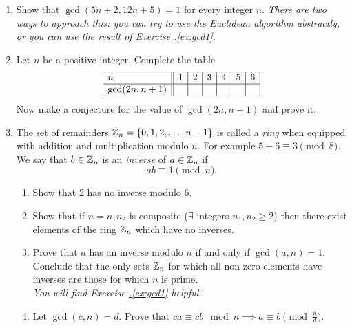 \begin{exercises}{}{}
\begin{enumerate}
  \item Show that $\gcd(5n+2,12n+5)=1$ for every integer $n$. \emph{There are two ways to approach this: you can try to use the Euclidean algorithm abstractly, or you can use the result of Exercise \hyperref[ex:gcd1]{\thesubsection.\ref*{ex:gcd1}}.}
  
  \item Let $n$ be a positive integer. Complete the table
  \[\begin{array}{|l||c|c|c|c|c|c|}
  \hline
  n&1&2&3&4&5&6\\\hline
  \gcd(2n,n+1)&&&&&&\\\hline
  \end{array}\]
  Now make a conjecture for the value of $\gcd(2n,n+1)$ and prove it.
  
  \item The set of remainders $\mathbb{Z}_n=\{0,1,2,\ldots,n-1\}$ is called a \emph{ring} when equipped with addition and multiplication modulo $n$. For example $5+6\equiv 3\pmod{8}$. We say that $b\in\mathbb{Z}_n$ is an \emph{inverse} of $a\in\mathbb{Z}_n$ if
	\[ab\equiv 1\pmod n.\]
	\begin{enumerate}
	  \item Show that 2 has no inverse modulo 6.
	  \item Show that if $n=n_1n_2$ is composite ($\exists$ integers $n_1,n_2\ge 2$) then there exist elements of the ring $\mathbb{Z}_n$ which have no inverses.
	  \item Prove that $a$ has an inverse modulo $n$ if and only if $\gcd(a,n)=1$. Conclude that the only sets $\mathbb{Z}_n$ for which all non-zero elements have inverses are those for which $n$ is prime.\\
	  \emph{You will find Exercise \hyperref[ex:gcd1]{\thesubsection.\ref*{ex:gcd1}} helpful.}
	  
	  \item Let $\gcd(c,n)=d$. Prove that $ca\equiv cb\mod n\implies a\equiv b\pmod{\frac nd}$.
	\end{enumerate}
\end{enumerate}


\end{exercises}
